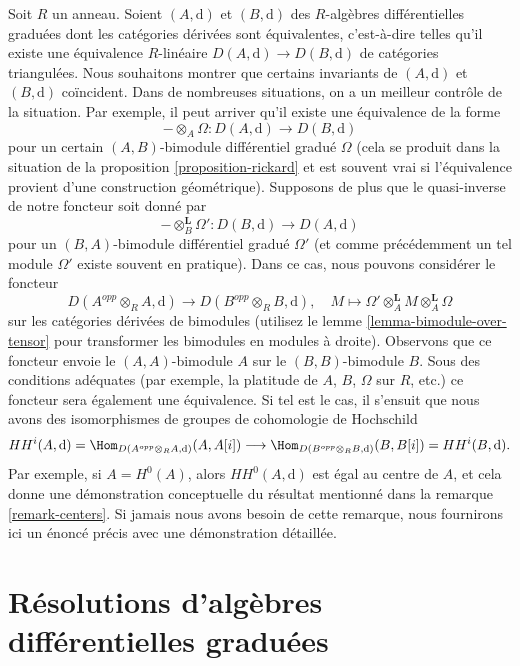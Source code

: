 \begin{remark}
\label{remark-hochschild-cohomology}
Soit $R$ un anneau. Soient $(A, \text{d})$ et $(B, \text{d})$ des $R$-algèbres
différentielles graduées dont les catégories dérivées sont équivalentes, c'est-à-dire
telles qu'il existe une équivalence $R$-linéaire $D(A, \text{d}) \to D(B,
\text{d})$ de catégories triangulées. Nous souhaitons montrer que certains invariants
de $(A, \text{d})$ et $(B, \text{d})$ coïncident. Dans de nombreuses
situations, on a un meilleur contrôle de la situation. Par exemple, il peut arriver
qu'il existe une équivalence de la forme
$$
- \otimes_A \Omega : D(A, \text{d}) \longrightarrow D(B, \text{d})
$$
pour un certain $(A, B)$-bimodule différentiel gradué
$\Omega$ (cela se produit dans la situation de la
proposition \ref{proposition-rickard} et est souvent vrai si
l'équivalence provient d'une construction géométrique). Supposons de
plus que le quasi-inverse de notre foncteur soit donné par
$$
- \otimes_B^\mathbf{L} \Omega' : D(B, \text{d}) \longrightarrow D(A, \text{d})
$$
pour un $(B, A)$-bimodule différentiel gradué $\Omega'$ (et
comme précédemment un tel module $\Omega'$ existe souvent en pratique).
Dans ce cas, nous pouvons considérer le foncteur
$$
D(A^{opp} \otimes_R A, \text{d})
\longrightarrow
D(B^{opp} \otimes_R B, \text{d}),\quad
M \longmapsto \Omega' \otimes^\mathbf{L}_A M \otimes_A^\mathbf{L} \Omega
$$
sur les catégories dérivées de bimodules
(utilisez le lemme \ref{lemma-bimodule-over-tensor} pour transformer les
bimodules en
modules à droite). Observons que ce foncteur envoie le $(A, A)$-bimodule
$A$ sur le $(B, B)$-bimodule $B$. Sous des conditions adéquates
(par exemple, la platitude de $A$, $B$, $\Omega$ sur $R$,
etc.) ce foncteur sera également une équivalence. Si
tel est le cas, il s'ensuit que nous avons des isomorphismes de groupes
de cohomologie de Hochschild
$$
HH^i(A, \text{d}) =
\Hom_{D(A^{opp} \otimes_R A, \text{d})}(A, A[i])
\longrightarrow
\Hom_{D(B^{opp} \otimes_R B, \text{d})}(B, B[i]) =
HH^i(B, \text{d}).
$$
Par exemple, si $A = H^0(A)$, alors $HH^0(A, \text{d})$ est
égal au centre de $A$, et cela donne une démonstration conceptuelle du
résultat mentionné dans la remarque \ref{remark-centers}. Si jamais nous
avons besoin de cette remarque, nous fournirons ici un énoncé précis avec
une démonstration détaillée.
\end{remark}



\section{Résolutions d'algèbres différentielles graduées}
\label{section-resolution-dgas}

